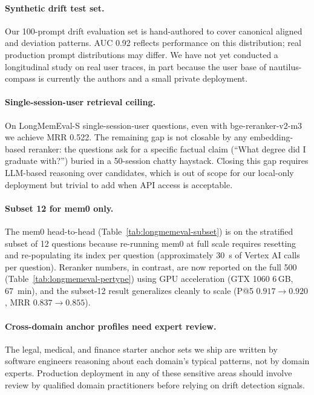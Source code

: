 \paragraph{Synthetic drift test set.} Our 100-prompt drift evaluation
set is hand-authored to cover canonical aligned and deviation
patterns. AUC 0.92 reflects performance on this distribution; real
production prompt distributions may differ. We have not yet conducted
a longitudinal study on real user traces, in part because the user
base of nautilus-compass is currently the authors and a small private
deployment.

\paragraph{Single-session-user retrieval ceiling.} On LongMemEval-S
single-session-user questions, even with bge-reranker-v2-m3 we
achieve MRR 0.522. The remaining gap is not closable by any
embedding-based reranker: the questions ask for a specific factual
claim (``What degree did I graduate with?'') buried in a 50-session
chatty haystack. Closing this gap requires LLM-based reasoning over
candidates, which is out of scope for our local-only deployment but
trivial to add when API access is acceptable.

\paragraph{Subset 12 for mem0 only.} The mem0 head-to-head
(Table~\ref{tab:longmemeval-subset}) is on the stratified subset of
12 questions because re-running mem0 at full scale requires resetting
and re-populating its index per question (approximately 30~s of
Vertex AI calls per question). Reranker numbers, in contrast, are now
reported on the full 500 (Table~\ref{tab:longmemeval-pertype}) using
GPU acceleration (GTX 1060 6\,GB, 67~min), and the subset-12 result
generalizes cleanly to scale (P@5 $0.917 \rightarrow 0.920$, MRR
$0.837 \rightarrow 0.855$).

\paragraph{Cross-domain anchor profiles need expert review.} The
legal, medical, and finance starter anchor sets we ship are written
by software engineers reasoning about each domain's typical patterns,
not by domain experts. Production deployment in any of these
sensitive areas should involve review by qualified domain
practitioners before relying on drift detection signals.

